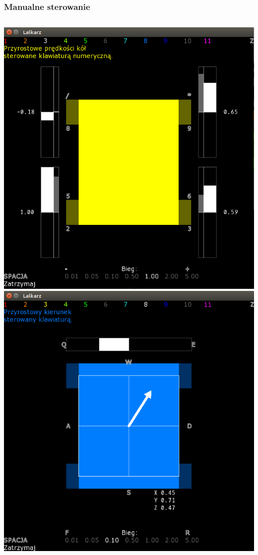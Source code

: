 \documentclass{beamer}
\begin{document}
	\begin{frame}
		\frametitle{Manualne sterowanie}
		\begin{columns}[c]
			\centering
			\includegraphics[width=\textwidth]{graphics/lalkarz_1.png} \\
			\centering
			\includegraphics[width=\textwidth]{graphics/lalkarz_2.png} \\

\end{columns}
\end{frame}
\end{document}
